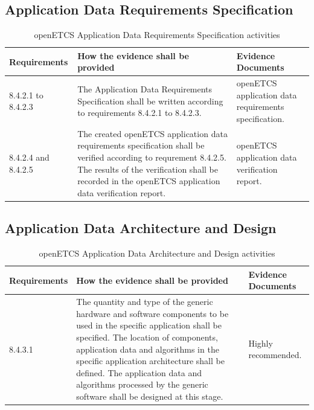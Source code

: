 \documentclass{template/openetcs_report}
\begin{document}
\subsection{Application Data Requirements Specification}
{\footnotesize\sffamily\centering
\begin{longtable}{|p{2cm}|p{9cm}|p{3cm}|}
\caption{openETCS Application Data Requirements Specification activities}\\
\hline
\bfseries Requirements & \bfseries How the evidence shall be provided & \bfseries Evidence Documents\\
\hline
\hline
\endhead
\hline
\endfoot

8.4.2.1 to 8.4.2.3 & The Application Data Requirements Specification shall be written according to requirements 8.4.2.1 to 8.4.2.3. & openETCS application data requirements specification.\\ 
\hline
8.4.2.4 and 8.4.2.5 & The created openETCS application data requirements specification shall be verified according to requrement 8.4.2.5.
The results of the verification shall be recorded in the openETCS application data verification report. & openETCS application data verification report.\\ 
\hline
\end{longtable}}


\subsection{Application Data Architecture and Design}
{\footnotesize\sffamily\centering
\begin{longtable}{|p{2cm}|p{9cm}|p{3cm}|}
\caption{openETCS Application Data Architecture and Design activities}\\
\hline
\bfseries Requirements & \bfseries How the evidence shall be provided & \bfseries Evidence Documents\\
\hline
\hline
\endhead
\hline
\endfoot

8.4.3.1  & The quantity and type of the generic hardware and software components to be used in the specific application shall be specified. The location of components, application data and algorithms in the specific application architecture shall be defined. The application data and algorithms processed by the generic software shall be designed at this stage.
& Highly recommended.\\ 
\hline
\end{longtable}}
\end{document}
